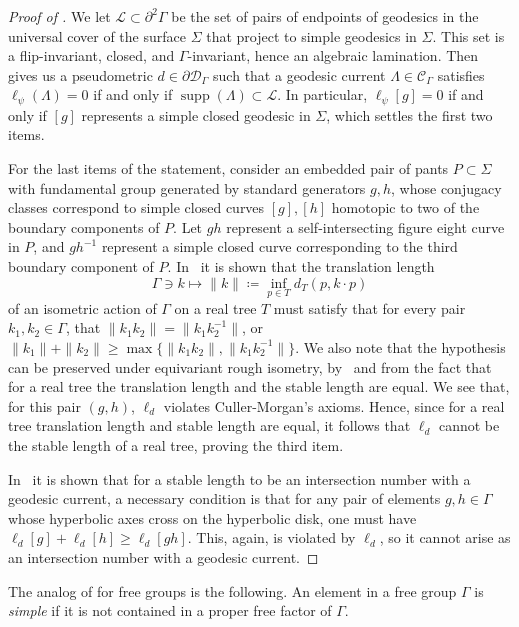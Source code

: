 \documentclass[twoside]{amsart}
\theoremstyle{definition}
\numberwithin{equation}{section}
\numberwithin{theorem}{section}
\newcommand{\calC}{\mathcal{C}}
\newcommand{\calD}{\mathcal{D}}
\newcommand{\calL}{\mathcal{L}}
\newcommand{\G}{\Gamma}
\newcommand{\Lam}{\Lambda}
\newcommand{\Sig}{\Sigma}
\newcommand{\p}{\psi}
\DeclareMathOperator{\supp}{supp}
\newcommand{\ppG}{\partial^2 \G}
\begin{document}
\begin{proof}[Proof of ]
    We let $\calL\subset \ppG$ be the set of pairs of endpoints of geodesics in the universal cover of the surface $\Sig$ that project to simple geodesics in $\Sig$. This set is a flip-invariant, closed, and $\G$-invariant, hence an algebraic lamination. Then  gives us a pseudometric $d\in \partial \calD_\G$ such that a geodesic current $\Lam\in \calC_\G$ satisfies $\ell_\p(\Lam)=0$ if and only if $\supp(\Lam)\subset \calL$. In particular, $\ell_\p[g]=0$ if and only if $[g]$ represents a simple closed geodesic in $\Sig$, which settles the first two items.
    

    For the last items of the statement, consider an embedded pair of pants $P \subset \Sig$ with fundamental group generated by standard generators $g,h$,
whose conjugacy classes correspond to simple closed curves $[g], [h]$ homotopic to two of the boundary components of $P$. Let
$gh$ represent a self-intersecting figure eight curve in $P$, and $gh^{-1}$ represent a simple closed curve corresponding to the third
boundary component of $P$. 
In~\cite[Section~1.11]{CM87:GroupActions} it is shown that the translation length $$ \G \ni k\mapsto\|k\| \coloneqq \inf_{p \in T} d_T(p,k\cdot p)$$ of an isometric action of $\G$ on a real tree $T$ must satisfy that for every
pair $k_1,k_2 \in \G$, that $\|k_1k_2\| = \|k_1k_2^{-1}\|$, or
$\|k_1\| + \|k_2 \| \geq \max \{\|k_1k_2 \|, \|k_1k_2^{-1}\|\}$.
We also note that the hypothesis can be preserved under equivariant rough isometry, by~\cite[Theorem~3.7]{CM87:GroupActions} and from the fact that for a real tree the translation length and the stable length are equal.
We see that, for this pair $(g,h)$, $\ell_d$ violates Culler-Morgan's axioms. Hence, since for a real tree translation length and stable length are equal, it follows that $\ell_d$ cannot be the stable length of a real tree, proving the third item.

In~\cite[Theorem~A']{MGT26:Intersections} it is shown that for a stable length to be an intersection number with a geodesic current,
a necessary condition is that for any pair of elements $g, h \in \G$ whose hyperbolic axes cross on the hyperbolic disk, one must have
$\ell_d[g] + \ell_d[h] \geq \ell_d[gh]$. This, again, is violated by $\ell_d$, so it cannot arise as an intersection number with a geodesic current.
\end{proof}

The analog of  for free groups is the following. An element in a free group $\G$ is \emph{simple} if it is not contained in a proper free factor of $\G$.
\end{document}
